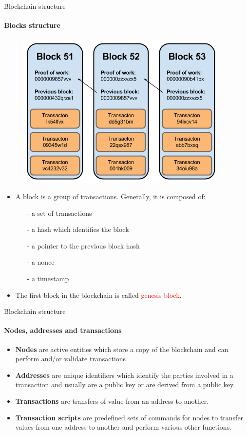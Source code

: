 \documentclass{beamer}
\newcommand\red[1]{\textcolor{red}{#1}}
\begin{document}
  \begin{frame}{Blockchain structure}
    \framesubtitle{Blocks structure}
        \begin{figure}[!htb]
          \centering
          \includegraphics[width=0.3\linewidth]{../img/blockchain-basic-schema.png}
        \end{figure}
      \begin{itemize}
        \item  A block is a group of transactions. Generally, it is composed of:
        \begin{itemize}
          \item[-] a set of transactions
          \item[-] a hash which identifies the block
          \item[-] a pointer to the previous block hash
          \item[-] a nonce
          \item[-] a timestamp
        \end{itemize}
        \item The first block in the blockchain is called \red{genesis block}.
      \end{itemize}
  \end{frame}




  \begin{frame}{Blockchain structure}
    \framesubtitle{Nodes, addresses and transactions}
    \begin{itemize}
      \item \textbf{Nodes} are active entities which store a copy of the blockchain and can
      perform and/or validate transactions \pause
      \item \textbf{Addresses} are unique identifiers which identify the parties involved in a
      transaction and usually are a public key or are derived from a public key. \pause
      \item \textbf{Transactions} are transfers of value from an address to another. \pause
      \item \textbf{Transaction scripts} are predefined sets of commands for nodes to transfer
      values from one address to another and perform various other functions.
    \end{itemize}
  \end{frame}
\end{document}
